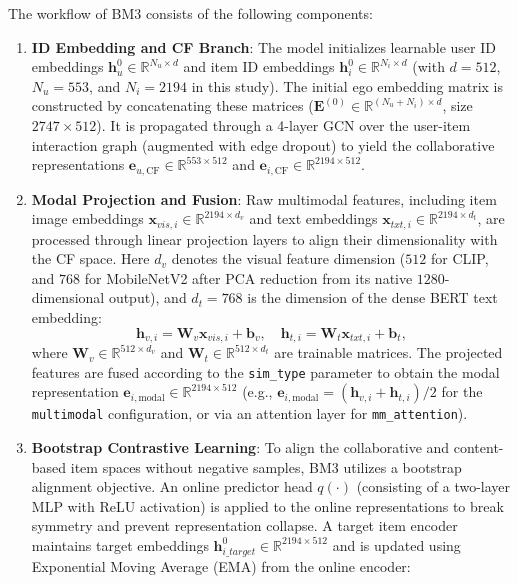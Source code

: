 The workflow of BM3 consists of the following components:
\begin{enumerate}
    \item \textbf{ID Embedding and CF Branch}: The model initializes learnable user ID embeddings $\mathbf{h}_u^0 \in \mathbb{R}^{N_u \times d}$ and item ID embeddings $\mathbf{h}_i^0 \in \mathbb{R}^{N_i \times d}$ (with $d = 512$, $N_u = 553$, and $N_i = 2194$ in this study). The initial ego embedding matrix is constructed by concatenating these matrices ($\mathbf{E}^{(0)} \in \mathbb{R}^{(N_u + N_i) \times d}$, size $2747 \times 512$). It is propagated through a 4-layer GCN over the user-item interaction graph (augmented with edge dropout) to yield the collaborative representations $\mathbf{e}_{u, \text{CF}} \in \mathbb{R}^{553 \times 512}$ and $\mathbf{e}_{i, \text{CF}} \in \mathbb{R}^{2194 \times 512}$.
    \item \textbf{Modal Projection and Fusion}: Raw multimodal features, including item image embeddings $\mathbf{x}_{vis,i} \in \mathbb{R}^{2194 \times d_v}$ and text embeddings $\mathbf{x}_{txt,i} \in \mathbb{R}^{2194 \times d_t}$, are processed through linear projection layers to align their dimensionality with the CF space. Here $d_v$ denotes the visual feature dimension ($512$ for CLIP, and $768$ for MobileNetV2 after PCA reduction from its native $1280$-dimensional output), and $d_t = 768$ is the dimension of the dense BERT text embedding:
    \begin{equation}
        \mathbf{h}_{v,i} = \mathbf{W}_v \mathbf{x}_{vis,i} + \mathbf{b}_v, \quad \mathbf{h}_{t,i} = \mathbf{W}_t \mathbf{x}_{txt,i} + \mathbf{b}_t,
    \end{equation}
    where $\mathbf{W}_v \in \mathbb{R}^{512 \times d_v}$ and $\mathbf{W}_t \in \mathbb{R}^{512 \times d_t}$ are trainable matrices. The projected features are fused according to the \texttt{sim\_type} parameter to obtain the modal representation $\mathbf{e}_{i, \text{modal}} \in \mathbb{R}^{2194 \times 512}$ (e.g., $\mathbf{e}_{i, \text{modal}} = (\mathbf{h}_{v,i} + \mathbf{h}_{t,i})/2$ for the \texttt{multimodal} configuration, or via an attention layer for \texttt{mm\_attention}).
    \item \textbf{Bootstrap Contrastive Learning}: To align the collaborative and content-based item spaces without negative samples, BM3 utilizes a bootstrap alignment objective. An online predictor head $q(\cdot)$ (consisting of a two-layer MLP with ReLU activation) is applied to the online representations to break symmetry and prevent representation collapse. A target item encoder maintains target embeddings $\mathbf{h}_{i\_target}^0 \in \mathbb{R}^{2194 \times 512}$ and is updated using Exponential Moving Average (EMA) from the online encoder:

\end{enumerate}
